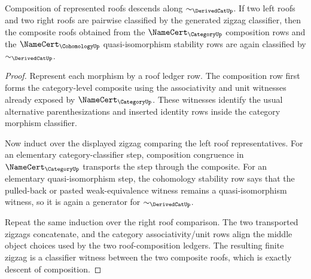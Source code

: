 \begin{theorem}
\label{thm:derivedcat-composition-descent-obligation}
Composition of represented roofs descends along $\sim_{\DerivedCatUp}$. If two left roofs and two right roofs are pairwise classified by the generated zigzag classifier, then the composite roofs obtained from the $\NameCert_{\CategoryUp}$ composition rows and the $\NameCert_{\CohomologyUp}$ quasi-isomorphism stability rows are again classified by $\sim_{\DerivedCatUp}$.
\end{theorem}
\begin{proof}
Represent each morphism by a roof ledger row. The composition row first forms the category-level composite using the associativity and unit witnesses already exposed by $\NameCert_{\CategoryUp}$. These witnesses identify the usual alternative parenthesizations and inserted identity rows inside the category morphism classifier.

Now induct over the displayed zigzag comparing the left roof representatives. For an elementary category-classifier step, composition congruence in $\NameCert_{\CategoryUp}$ transports the step through the composite. For an elementary quasi-isomorphism step, the cohomology stability row says that the pulled-back or pasted weak-equivalence witness remains a quasi-isomorphism witness, so it is again a generator for $\sim_{\DerivedCatUp}$.

Repeat the same induction over the right roof comparison. The two transported zigzags concatenate, and the category associativity/unit rows align the middle object choices used by the two roof-composition ledgers. The resulting finite zigzag is a classifier witness between the two composite roofs, which is exactly descent of composition.
\end{proof}

